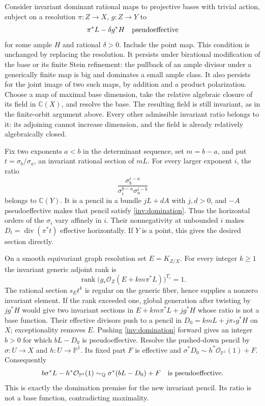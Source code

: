 Consider invariant dominant rational maps to projective bases with
trivial action, subject on a resolution $\pi:Z\to X$, $g:Z\to Y$
to
\begin{equation}\label{inv:domination}
 \pi^*L-\delta g^*H\quad\hbox{pseudoeffective}
\end{equation}
for some ample $H$ and rational $\delta>0$.  Include the point map.
This condition is unchanged by replacing the resolution.  It persists
under birational modification of the base or its finite Stein
refinement: the pullback of an ample divisor under a generically finite
map is big and dominates a small ample class.  It also persists for the
joint image of two such maps, by addition and a product polarization.
Choose a map of maximal base dimension, take the relative algebraic
closure of its field in $\mathbb C(X)$, and resolve the base.  The
resulting field is still invariant, as in the finite-orbit argument
above.  Every other admissible invariant ratio belongs to it: its
adjoining cannot increase dimension, and the field is already
relatively algebraically closed.

Fix two exponents $a<b$ in the determinant sequence, set $m=b-a$, and
put $t=\sigma_b/\sigma_a$, an invariant rational section of $mL$.
For every larger exponent $i$, the ratio
\[
 \frac{\sigma_b^{i-a}}{\sigma_i^{b-a}\sigma_a^{i-b}}
\]
belongs to $\mathbb C(Y)$.  It is a pencil in a bundle $jL+dA$
with $j,d>0$, and $-A$ pseudoeffective makes that pencil satisfy
\eqref{inv:domination}.  Thus the horizontal orders of the
$\sigma_i$ vary affinely in $i$.  Their nonnegativity at unbounded
$i$ makes $D_t=\operatorname{div}(\pi^*t)$ effective horizontally.
If $Y$ is a point, this gives the desired section directly.

On a smooth equivariant graph resolution set $E=K_{Z/X}$.
For every integer $k\ge1$ the invariant generic adjoint rank is
\begin{equation}\label{inv:all-ranks}
 \operatorname{rank}\bigl(g_*\mathcal O_Z(E+km\pi^*L)\bigr)^{T_c}=1.
\end{equation}
The rational section $s_Et^k$ is regular on the generic fiber, hence
supplies a nonzero invariant element.  If the rank exceeded one,
global generation after twisting by $jg^*H$ would give two invariant
sections in $E+km\pi^*L+jg^*H$ whose ratio is not a base function.
Their effective divisors push to a pencil in
$D_0=kmL+j\pi_*g^*H$ on $X$; exceptionality removes $E$.
Pushing \eqref{inv:domination} forward gives an integer $b>0$ for
which $bL-D_0$ is pseudoeffective.  Resolve the pushed-down pencil by
$\sigma:U\to X$ and $h:U\to\mathbb P^1$.  Its fixed part $F$ is
effective and
$\sigma^*D_0\sim h^*\mathcal O_{\mathbb P^1}(1)+F$.  Consequently
\[
 b\sigma^*L-h^*\mathcal O_{\mathbb P^1}(1)
 \sim_{\mathbb Q}\sigma^*(bL-D_0)+F
 \quad\hbox{is pseudoeffective}.
\]
This is exactly the domination premise for the new invariant pencil.
Its ratio is not a base function, contradicting maximality.

